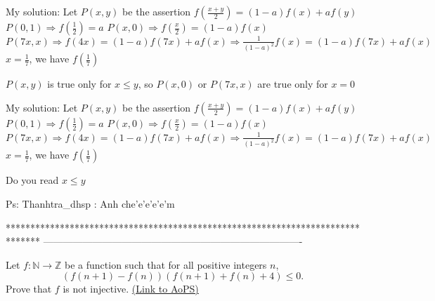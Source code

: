 \begin{solution}
	\begin{tcolorbox}My solution:
Let $ P(x,y)$ be the assertion $ f(\frac {x + y}2) = (1 - a)f(x) + af(y)$
$ P(0, 1)\Rightarrow f(\frac {1}{2}) = a$
$ P(x, 0)\Rightarrow f(\frac {x}{2}) = (1 - a)f(x)$
$ P(7x, x)\Rightarrow f(4x) = (1 - a)f(7x) + af(x)\Rightarrow \frac {1}{(1 - a)^2}f(x) = (1 - a)f(7x) + af(x)$
$ x = \frac {1}{7}$, we have $ f(\frac {1}{7})$
\end{tcolorbox}

$ P(x,y)$ is true only for $ x\leq y$, so $ P(x,0)$ or $ P(7x,x)$ are true only for $ x=0$
\end{solution}



\begin{solution}
	\begin{tcolorbox}My solution:
Let $ P(x,y)$ be the assertion $ f(\frac {x + y}2) = (1 - a)f(x) + af(y)$
$ P(0, 1)\Rightarrow f(\frac {1}{2}) = a$
$ P(x, 0)\Rightarrow f(\frac {x}{2}) = (1 - a)f(x)$
$ P(7x, x)\Rightarrow f(4x) = (1 - a)f(7x) + af(x)\Rightarrow \frac {1}{(1 - a)^2}f(x) = (1 - a)f(7x) + af(x)$
$ x = \frac {1}{7}$, we have $ f(\frac {1}{7})$
\end{tcolorbox}
Do you read  $ x \leq y$

P\/s: Thanhtra_dhsp : Anh che'e'e'e'e'm
\end{solution}
*******************************************************************************
-------------------------------------------------------------------------------

\begin{problem}
	Let $ f: \mathbb N \to \mathbb Z$ be a function such that for all positive integers $n$, \[(f(n+1)-f(n))(f(n+1)+f(n)+4)\leq0.\] Prove that $f$ is not injective.
	\flushright \href{https://artofproblemsolving.com/community/c6h298954}{(Link to AoPS)}
\end{problem}



